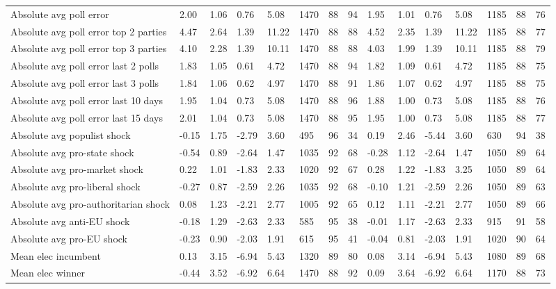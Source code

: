 \begin{longtable}{lllllllllllllll}
Absolute avg poll error & 2.00 & 1.06 & 0.76 & 5.08 & 1470 & 88 & 94 & 1.95 & 1.01 & 0.76 & 5.08 & 1185 & 88 & 76\\
Absolute avg poll error top 2 parties & 4.47 & 2.64 & 1.39 & 11.22 & 1470 & 88 & 88 & 4.52 & 2.35 & 1.39 & 11.22 & 1185 & 88 & 77\\
\addlinespace
Absolute avg poll error top 3 parties & 4.10 & 2.28 & 1.39 & 10.11 & 1470 & 88 & 88 & 4.03 & 1.99 & 1.39 & 10.11 & 1185 & 88 & 79\\
Absolute avg poll error last 2 polls & 1.83 & 1.05 & 0.61 & 4.72 & 1470 & 88 & 94 & 1.82 & 1.09 & 0.61 & 4.72 & 1185 & 88 & 75\\
Absolute avg poll error last 3 polls & 1.84 & 1.06 & 0.62 & 4.97 & 1470 & 88 & 91 & 1.86 & 1.07 & 0.62 & 4.97 & 1185 & 88 & 75\\
Absolute avg poll error last 10 days & 1.95 & 1.04 & 0.73 & 5.08 & 1470 & 88 & 96 & 1.88 & 1.00 & 0.73 & 5.08 & 1185 & 88 & 76\\
Absolute avg poll error last 15 days & 2.01 & 1.04 & 0.73 & 5.08 & 1470 & 88 & 95 & 1.95 & 1.00 & 0.73 & 5.08 & 1185 & 88 & 77\\
\addlinespace
Absolute avg populist shock & -0.15 & 1.75 & -2.79 & 3.60 & 495 & 96 & 34 & 0.19 & 2.46 & -5.44 & 3.60 & 630 & 94 & 38\\
Absolute avg pro-state shock & -0.54 & 0.89 & -2.64 & 1.47 & 1035 & 92 & 68 & -0.28 & 1.12 & -2.64 & 1.47 & 1050 & 89 & 64\\
Absolute avg pro-market shock & 0.22 & 1.01 & -1.83 & 2.33 & 1020 & 92 & 67 & 0.28 & 1.22 & -1.83 & 3.25 & 1050 & 89 & 64\\
Absolute avg pro-liberal shock & -0.27 & 0.87 & -2.59 & 2.26 & 1035 & 92 & 68 & -0.10 & 1.21 & -2.59 & 2.26 & 1050 & 89 & 63\\
Absolute avg pro-authoritarian shock & 0.08 & 1.23 & -2.21 & 2.77 & 1005 & 92 & 65 & 0.12 & 1.11 & -2.21 & 2.77 & 1050 & 89 & 66\\
\addlinespace
Absolute avg anti-EU shock & -0.18 & 1.29 & -2.63 & 2.33 & 585 & 95 & 38 & -0.01 & 1.17 & -2.63 & 2.33 & 915 & 91 & 58\\
Absolute avg pro-EU shock & -0.23 & 0.90 & -2.03 & 1.91 & 615 & 95 & 41 & -0.04 & 0.81 & -2.03 & 1.91 & 1020 & 90 & 64\\
Mean elec incumbent & 0.13 & 3.15 & -6.94 & 5.43 & 1320 & 89 & 80 & 0.08 & 3.14 & -6.94 & 5.43 & 1080 & 89 & 68\\
Mean elec winner & -0.44 & 3.52 & -6.92 & 6.64 & 1470 & 88 & 92 & 0.09 & 3.64 & -6.92 & 6.64 & 1170 & 88 & 73\\

\end{longtable}
